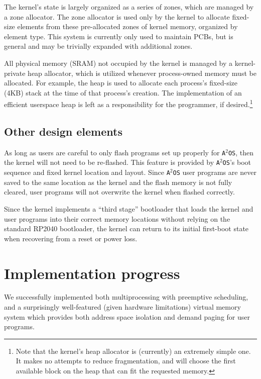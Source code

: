 \documentclass[12pt]{article}
\newcommand{\os}{\texttt{A$^2$OS} }
\newcommand{\osns}{\texttt{A$^2$OS}}
\begin{document}
The kernel's state is largely organized as a series of zones, which are managed
by a zone allocator. The zone allocator is used only by the kernel to allocate
fixed-size elements from these pre-allocated zones of kernel memory, organized
by element type. This system is currently only used to maintain PCBs, but is
general and may be trivially expanded with additional zones.

All physical memory (SRAM) not occupied by the kernel is managed by a
kernel-private heap allocator, which is utilized whenever process-owned memory
must be allocated. For example, the heap is used to allocate each process's
fixed-size (4KB) stack at the time of that process's creation. The
implementation of an efficient userspace heap is left as a responsibility for
the programmer, if desired.\footnote{Note
that the kernel's heap allocator is (currently) an extremely simple one. It
makes no attempts to reduce fragmentation, and will choose the first available
block on the heap that can fit the requested memory.}

\subsection{Other design elements}
As long as users are careful to only flash programs set up properly for \osns,
then the kernel will not need to be re-flashed. This feature is provided by
\osns's boot sequence and fixed kernel location and layout. Since \os user
programs are never saved to the same location as the kernel and the flash memory
is not fully cleared, user programs will not overwrite the kernel when flashed
correctly.

Since the kernel implements a ``third stage'' bootloader that loads the kernel
and user programs into their correct memory locations without relying on the
standard RP2040 bootloader, the kernel can return to its initial first-boot
state when recovering from a reset or power loss.

\section{Implementation progress}

We successfully implemented both multiprocessing with preemptive scheduling, and
a surprisingly well-featured (given hardware limitations) virtual memory system
which provides both address space isolation and demand paging for user programs.
\end{document}
